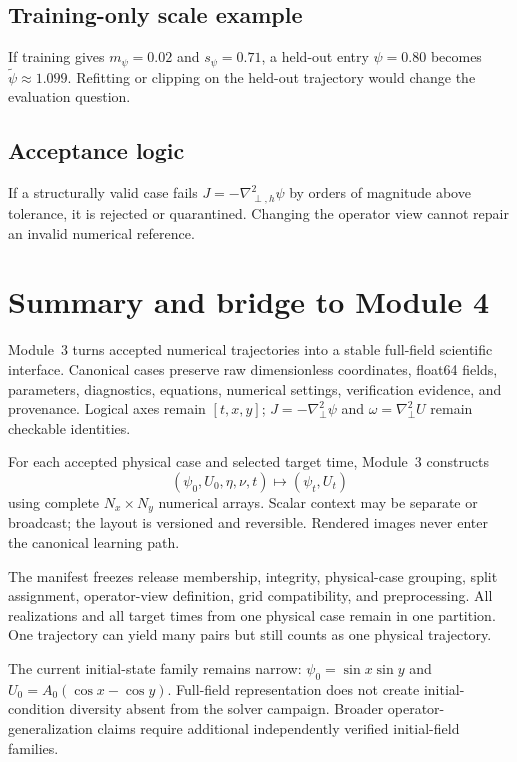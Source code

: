 \documentclass[11pt]{article}
\newcommand{\Lap}{\nabla_{\!\perp}^{2}}
\newcommand{\Laph}{\nabla_{\!\perp,h}^{2}}
\begin{document}
\subsection{Training-only scale example}
If training gives $m_\psi=0.02$ and $s_\psi=0.71$, a held-out entry $\psi=0.80$ becomes $\widetilde\psi\approx1.099$. Refitting or clipping on the held-out trajectory would change the evaluation question.

\subsection{Acceptance logic}
If a structurally valid case fails $J=-\Laph\psi$ by orders of magnitude above tolerance, it is rejected or quarantined. Changing the operator view cannot repair an invalid numerical reference.

\section{Summary and bridge to Module 4}
\label{sec:summary}

Module~3 turns accepted numerical trajectories into a stable full-field scientific interface. Canonical cases preserve raw dimensionless coordinates, float64 fields, parameters, diagnostics, equations, numerical settings, verification evidence, and provenance. Logical axes remain $[t,x,y]$; $J=-\Lap\psi$ and $\omega=\Lap U$ remain checkable identities.

For each accepted physical case and selected target time, Module~3 constructs
\begin{equation}
(\psi_0,U_0,\eta,\nu,t)\longmapsto(\psi_t,U_t)
\end{equation}
using complete $N_x\times N_y$ numerical arrays. Scalar context may be separate or broadcast; the layout is versioned and reversible. Rendered images never enter the canonical learning path.

The manifest freezes release membership, integrity, physical-case grouping, split assignment, operator-view definition, grid compatibility, and preprocessing. All realizations and all target times from one physical case remain in one partition. One trajectory can yield many pairs but still counts as one physical trajectory.

The current initial-state family remains narrow: $\psi_0=\sin x\sin y$ and $U_0=A_0(\cos x-\cos y)$. Full-field representation does not create initial-condition diversity absent from the solver campaign. Broader operator-generalization claims require additional independently verified initial-field families.
\end{document}
